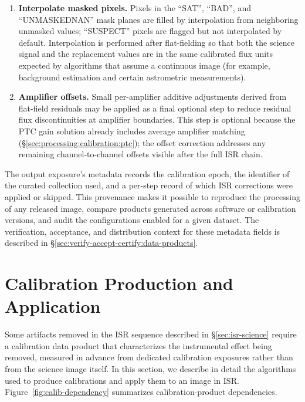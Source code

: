 \begin{enumerate}
    \item \textbf{Interpolate masked pixels.}
    Pixels in the ``SAT'', ``BAD'', and ``UNMASKEDNAN'' mask planes are filled by interpolation from neighboring unmasked values; ``SUSPECT'' pixels are flagged but not interpolated by default.
    Interpolation is performed after flat-fielding so that both the science signal and the replacement values are in the same calibrated flux units expected by algorithms that assume a continuous image (for example, background estimation and certain astrometric measurements).

    \item \textbf{Amplifier offsets.}
    Small per-amplifier additive adjustments derived from flat-field residuals may be applied as a final optional step to reduce residual flux discontinuities at amplifier boundaries.
    This step is optional because the PTC gain solution already includes average amplifier matching (\S\ref{sec:processing:calibration:ptc}); the offset correction addresses any remaining channel-to-channel offsets visible after the full ISR chain.
\end{enumerate}

The output exposure's metadata records the calibration epoch, the identifier of the curated collection used, and a per-step record of which ISR corrections were applied or skipped.
This provenance makes it possible to reproduce the processing of any released image, compare products generated across software or calibration versions, and audit the configurations enabled for a given dataset.
The verification, acceptance, and distribution context for these metadata fields is described in \S\ref{sec:verify-accept-certify:data-products}.

\section{Calibration Production and Application} \label{sec:calibration-production}

Some artifacts removed in the ISR sequence described in \S\ref{sec:isr-science} require a calibration data product that characterizes the instrumental effect being removed, measured in advance from dedicated calibration exposures rather than from the science image itself.
In this section, we describe in detail the algorithms used to produce calibrations and apply them to an image in ISR.
Figure~\ref{fig:calib-dependency} summarizes calibration-product dependencies.


